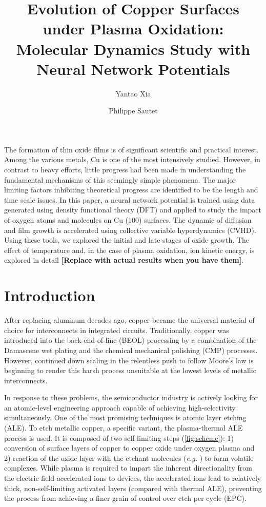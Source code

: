 \documentclass[manuscript=cmatex]{achemso}
\title          {Evolution of Copper Surfaces under Plasma Oxidation: Molecular Dynamics Study with Neural Network Potentials}
\author         {Yantao Xia}
\affiliation    {Department of Chemical and Biomolecular Engineering, University of California, Los Angeles, CA 90095, USA}
\author         {Philippe Sautet}
\affiliation    {Department of Chemical and Biomolecular Engineering, University of California, Los Angeles, CA 90095, USA}
\begin{document}
\abstract
The formation of thin oxide films is of significant scientific and practical interest. Among the various metals, Cu is one of the most intensively studied. However, in contrast to heavy efforts, little progress had been made in understanding the fundamental mechanisms of this seemingly simple phenomena. The major limiting factors inhibiting theoretical progress are identified to be the length and time scale issues. In this paper, a neural network potential is trained using data generated using density functional theory (DFT) and applied to study the impact of oxygen atoms and molecules on Cu (100) surfaces. The dynamic of diffusion and film growth is accelerated using collective variable hyperdynamics (CVHD). Using these tools, we explored the initial and late stages of oxide growth. The effect of temperature and, in the case of plasma oxidation, ion kinetic energy, is explored in detail \textbf{[Replace with actual results when you have them]}.

\section{Introduction}
\label{sec:intro}

After replacing aluminum decades ago, copper became the universal material of choice for interconnects in integrated circuits. Traditionally, copper was introduced into the back-end-of-line (BEOL) processing by a combination of the Damascene wet plating and the chemical mechanical polishing (CMP) processes. However, continued down scaling in the relentless push to follow Moore's law is beginning to render this harsh process unsuitable at the lowest levels of metallic interconnects. 

In response to these problems, the semiconductor industry is actively looking for an atomic-level engineering approach capable of achieving high-selectivity simultaneously. One of the most promising techniques is atomic layer etching (ALE). To etch metallic copper, a specific variant, the plasma-thermal ALE process is used. It is composed of two self-limiting steps (\cref{fig:scheme}): 1) conversion of surface layers of copper to copper oxide under oxygen plasma and 2) reaction of the oxide layer with the etchant molecules (\textit{e.g.} ) to form volatile complexes. While plasma is required to impart the inherent directionality from the electric field-accelerated ions to devices, the accelerated ions lead to relatively thick, non-self-limiting activated layers (compared with thermal ALE), preventing the process from achieving a finer grain of control over etch per cycle (EPC). 
\end{document}
